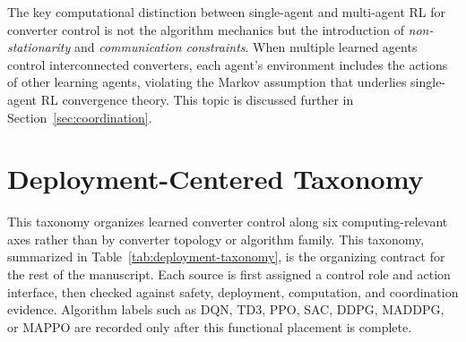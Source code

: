 \documentclass[manuscript,screen,review]{acmart}
\begin{document}
The key computational distinction between single-agent and multi-agent RL for converter control is not the algorithm mechanics but the introduction of \emph{non-stationarity} and \emph{communication constraints}.
When multiple learned agents control interconnected converters, each agent's environment includes the actions of other learning agents, violating the Markov assumption that underlies single-agent RL convergence theory.
This topic is discussed further in Section~\ref{sec:coordination}.

\section{Deployment-Centered Taxonomy}
\label{sec:taxonomy}

This taxonomy organizes learned converter control along six computing-relevant axes rather than by converter topology or algorithm family.
This taxonomy, summarized in Table~\ref{tab:deployment-taxonomy}, is the organizing contract for the rest of the manuscript.
Each source is first assigned a control role and action interface, then checked against safety, deployment, computation, and coordination evidence.
Algorithm labels such as DQN, TD3, PPO, SAC, DDPG, MADDPG, or MAPPO are recorded only after this functional placement is complete.
\end{document}
